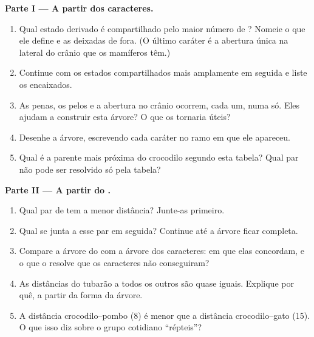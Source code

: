 \begin{problem}
\medskip
\noindent\textbf{Parte I --- A partir dos caracteres.}
\begin{enumerate}
  \item Qual estado derivado é compartilhado pelo maior número de
        ? Nomeie o  que ele define e as  deixadas
        de fora. (O último caráter é a abertura única na lateral do
        crânio que os mamíferos têm.)
  \item Continue com os estados compartilhados mais amplamente em
        seguida e liste os  encaixados.
  \item As penas, os pelos e a abertura no crânio ocorrem, cada um,
        numa  só. Eles ajudam a construir esta árvore? O que os
        tornaria úteis?
  \item Desenhe a árvore, escrevendo cada caráter no ramo em que ele
        apareceu.
  \item Qual  é a parente mais próxima do crocodilo segundo esta
        tabela? Qual par não pode ser resolvido só pela tabela?
\end{enumerate}

\medskip
\noindent\textbf{Parte II --- A partir do .}
\begin{enumerate}[resume]
  \item Qual par de  tem a menor distância? Junte-as primeiro.
  \item Qual  se junta a esse par em seguida? Continue até a
        árvore ficar completa.
  \item Compare a árvore do  com a árvore dos caracteres: em que
        elas concordam, e o que o  resolve que os caracteres não conseguiram?
  \item As distâncias do tubarão a todos os outros são quase iguais.
        Explique por quê, a partir da forma da árvore.
  \item A distância crocodilo--pombo (8) é menor que a distância
        crocodilo--gato (15). O que isso diz sobre o grupo cotidiano
        ``répteis''?
\end{enumerate}


\end{problem}
